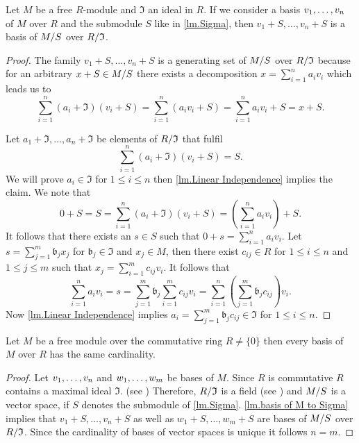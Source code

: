 \begin{lem}\label{lm.basis of M to Sigma}
Let $M$ be a free $R$-module and $\mathfrak{I}$ an ideal in $R$. If we consider a basis $\seq{v}$ of $M$ over $R$ and the submodule $S$ like in \cref{lm.Sigma}, then $v_1+S,\ldots,v_n+S$ is a basis of $\nicefrac{M}{S}$ over $\nicefrac{R}{\mathfrak{I}}$.
\end{lem}
\begin{proof}
The family $v_1+S,\ldots,v_n+S$ is a generating set of $\nicefrac{M}{S}$ over $\nicefrac{R}{\mathfrak{I}}$ because for an arbitrary $x+S\in\nicefrac{M}{S}$ there exists a decomposition $x=\sum_{i=1}^na_iv_i$ which leads us to 
\begin{equation*}
\sum_{i=1}^n(a_i+\mathfrak{I})(v_i+S)=\sum_{i=1}^n(a_iv_i+S)=\sum_{i=1}^na_iv_i+S=x+S.
\end{equation*}

Let $a_1+\mathfrak{I},\ldots,a_n+\mathfrak{I}$ be elements of $\nicefrac{R}{\mathfrak{I}}$ that fulfil
\[\sum_{i=1}^n(a_i+\mathfrak{I})(v_i+S)=S.\]
We will prove $a_i\in\mathfrak{I}$ for $1\leq i\leq n$ then \cref{lm.Linear Independence} implies the claim. We note that 
\begin{equation*}
0+S=S=\sum_{i=1}^n(a_i+\mathfrak{I})(v_i+S)=\left(\sum_{i=1}^n a_iv_i\right)+S.
\end{equation*}
It follows that there exists an $s\in S$ such that $0+s=\sum_{i=1}^n a_iv_i$. Let $s=\sum_{j=1}^m\mathfrak{b}_jx_j$ for $\mathfrak{b}_j\in \mathfrak{I}$ and $x_j\in M$, then there exist $c_{ij}\in R$ for $1\leq i\leq n$ and $1\leq j\leq m$ such that $x_j=\sum_{i=1}^mc_{ij}v_i$. It follows that
\begin{equation*}
\sum_{i=1}^n a_iv_i=s=\sum_{j=1}^m\mathfrak{b}_j\sum_{i=1}^mc_{ij}v_i=\sum_{i=1}^n\left(\sum_{j=1}^m\mathfrak{b}_jc_{ij}\right)v_i.
\end{equation*}
Now \cref{lm.Linear Independence} implies $a_i=\sum_{j=1}^m\mathfrak{b}_jc_{ij}\in \mathfrak{I}$ for $1\leq i\leq n$.
\end{proof}

\begin{thm}
Let $M$ be a free module over the commutative ring $R\neq\lbrace 0\rbrace$ then every basis of $M$ over $R$ has the same cardinality.
\end{thm}
\begin{proof}
Let $\seq{v}$ and $\seq[m]{w}$ be bases of $M$. Since $R$ is commutative $R$ contains a maximal ideal $\mathfrak{I}$. (see \cite[Thm.III.3.6]{jantzen2005algebra}) Therefore, $\nicefrac{R}{\mathfrak{I}}$ is a field (see \cite[p.93]{lang2002algebra}) and $\nicefrac{M}{S}$ is a vector space, if $S$ denotes the submodule of \cref{lm.Sigma}. \cref{lm.basis of M to Sigma} implies that $v_1+S,\ldots,v_n+S$ as well as $w_1+S,\ldots,w_m+S$ are bases of $\nicefrac{M}{S}$ over $\nicefrac{R}{\mathfrak{I}}$. Since the cardinality of bases of vector spaces is unique it follows $n=m$.
\end{proof}